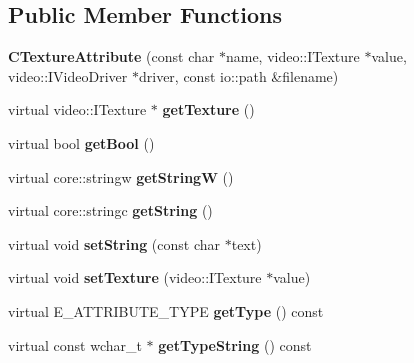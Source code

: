 \subsection*{Public Member Functions}
\begin{DoxyCompactItemize}
\item 
\hypertarget{classirr_1_1io_1_1_c_texture_attribute_a5af3367bd50da89c3473335345cf036c}{{\bfseries C\-Texture\-Attribute} (const char $\ast$name, video\-::\-I\-Texture $\ast$value, video\-::\-I\-Video\-Driver $\ast$driver, const io\-::path \&filename)}\label{classirr_1_1io_1_1_c_texture_attribute_a5af3367bd50da89c3473335345cf036c}

\item 
\hypertarget{classirr_1_1io_1_1_c_texture_attribute_a1bead74f266aa708cac14e046a0f56bc}{virtual video\-::\-I\-Texture $\ast$ {\bfseries get\-Texture} ()}\label{classirr_1_1io_1_1_c_texture_attribute_a1bead74f266aa708cac14e046a0f56bc}

\item 
\hypertarget{classirr_1_1io_1_1_c_texture_attribute_acfae5fcfc6d2f5486ce37c8974804546}{virtual bool {\bfseries get\-Bool} ()}\label{classirr_1_1io_1_1_c_texture_attribute_acfae5fcfc6d2f5486ce37c8974804546}

\item 
\hypertarget{classirr_1_1io_1_1_c_texture_attribute_a76199847e6cea9a6c6635ac003d7ddd7}{virtual core\-::stringw {\bfseries get\-String\-W} ()}\label{classirr_1_1io_1_1_c_texture_attribute_a76199847e6cea9a6c6635ac003d7ddd7}

\item 
\hypertarget{classirr_1_1io_1_1_c_texture_attribute_aecbdc70db7a824624e64f0937c70cc02}{virtual core\-::stringc {\bfseries get\-String} ()}\label{classirr_1_1io_1_1_c_texture_attribute_aecbdc70db7a824624e64f0937c70cc02}

\item 
\hypertarget{classirr_1_1io_1_1_c_texture_attribute_a086c640f076107a252cc123998a47ecc}{virtual void {\bfseries set\-String} (const char $\ast$text)}\label{classirr_1_1io_1_1_c_texture_attribute_a086c640f076107a252cc123998a47ecc}

\item 
\hypertarget{classirr_1_1io_1_1_c_texture_attribute_afc25f3f72742de97085e06bbae41ef76}{virtual void {\bfseries set\-Texture} (video\-::\-I\-Texture $\ast$value)}\label{classirr_1_1io_1_1_c_texture_attribute_afc25f3f72742de97085e06bbae41ef76}

\item 
\hypertarget{classirr_1_1io_1_1_c_texture_attribute_a19394ebf55da84ed5bc8e1d1de6c3f54}{virtual E\-\_\-\-A\-T\-T\-R\-I\-B\-U\-T\-E\-\_\-\-T\-Y\-P\-E {\bfseries get\-Type} () const }\label{classirr_1_1io_1_1_c_texture_attribute_a19394ebf55da84ed5bc8e1d1de6c3f54}

\item 
\hypertarget{classirr_1_1io_1_1_c_texture_attribute_a03c97d3424871706cfcdb12eed0a7b92}{virtual const wchar\-\_\-t $\ast$ {\bfseries get\-Type\-String} () const }\label{classirr_1_1io_1_1_c_texture_attribute_a03c97d3424871706cfcdb12eed0a7b92}

\end{DoxyCompactItemize}
